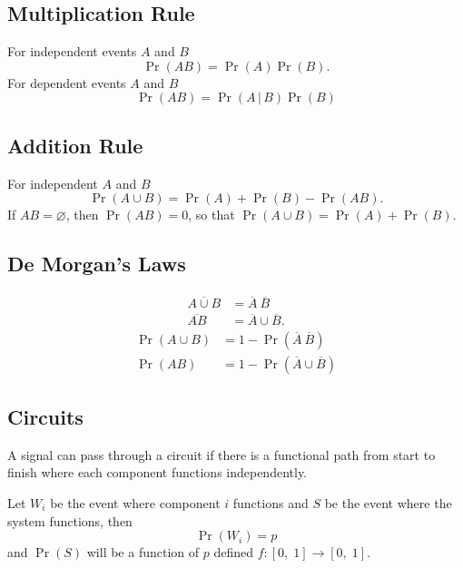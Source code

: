 \documentclass{article}
\begin{document}
\begin{multicols}{3}
    \subsection{Multiplication Rule}
    For independent events \(A\) and \(B\)
    \begin{equation*}
        \Pr{\left( AB \right)} = \Pr{\left( A \right)} \Pr{\left( B \right)}.
    \end{equation*}
    For dependent events \(A\) and \(B\)
    \begin{equation*}
        \Pr{\left( AB \right)} = \Pr{\left( A \,\vert \, B \right)} \Pr{\left( B \right)}
    \end{equation*}
    \subsection{Addition Rule}
    For independent \(A\) and \(B\)
    \begin{equation*}
        \Pr{\left( A \cup B \right)} = \Pr{\left( A \right)} + \Pr{\left( B \right)} - \Pr{\left( AB \right)}.
    \end{equation*}
    If \(AB = \varnothing \), then \(\Pr{\left( AB \right)} = 0\), so that \(\Pr{\left( A \cup B \right)} = \Pr{\left( A \right)} + \Pr{\left( B \right)}\).
    \subsection{De Morgan's Laws}
    \begin{align*}
        \overline{A \cup B} & = \overline{A} \ \overline{B}     \\
        \overline{AB}       & = \overline{A} \cup \overline{B}.
    \end{align*}
    \begin{align*}
        \Pr{\left( A \cup B \right)} & = 1 - \Pr{\left( \overline{A} \ \overline{B} \right)}    \\
        \Pr{\left( AB \right)}       & = 1 - \Pr{\left( \overline{A} \cup \overline{B} \right)}
    \end{align*}
    \subsection{Circuits}
    A signal can pass through a circuit if there is a functional path
    from start to finish where each component functions independently.

    Let \(W_i\) be the event where component \(i\) functions and \(S\)
    be the event where the system functions, then
    \begin{equation*}
        \Pr{\left( W_i \right)} = p
    \end{equation*}
    and \(\Pr{\left( S \right)}\) will be a function of \(p\) defined \(f:\left[ 0,\; 1 \right] \to \left[ 0,\; 1 \right]\).

\end{multicols}
\end{document}
